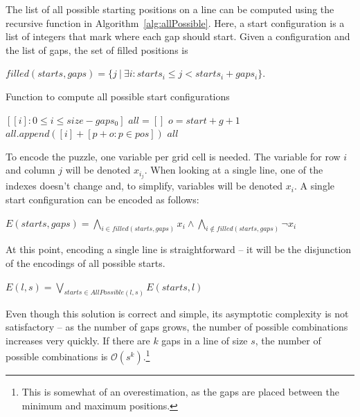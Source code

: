 \documentclass[12pt]{article}
\begin{document}
The list of all possible starting positions on a line can be computed using the recursive function in Algorithm~\ref{alg:allPossible}.
Here, a start configuration is a list of integers that mark where each gap should start.
Given a configuration and the list of gaps, the set of filled positions is

\begin{center}
  $filled(starts, gaps) = \{j\ |\ \exists i: starts_i \le j < starts_i + gaps_i\}$.
\end{center}

\begin{algorithm}
\caption{Function to compute all possible start configurations}\label{alg:allPossible}
\begin{algorithmic}
    \State\Return$[ [i]: 0 \le i \le size - gaps_0]$
  \Else
    \State$all = []$
      \State$o = start + g + 1$ 
          \State $all.append([i] + [p + o: p \in pos])$
      \EndFor
    \EndFor
    \State \Return $all$
  \EndIf
\EndFunction
\end{algorithmic}
\end{algorithm}

To encode the puzzle, one variable per grid cell is needed.
The variable for row $i$ and column $j$ will be denoted $x_i_j$.
When looking at a single line, one of the indexes doesn't change and, to simplify, variables will be denoted $x_i$.
A single start configuration can be encoded as follows:

\begin{center}
  $E(starts, gaps) = \bigwedge\limits_{i \in filled(starts, gaps)}x_i \wedge \bigwedge\limits_{i \notin filled(starts, gaps)} \neg x_i$
\end{center}

At this point, encoding a single line is straightforward -- it will be the disjunction of the encodings of all possible starts.

\begin{center}
  $E(l, s) = \bigvee_{starts \in AllPossible(l, s)} E(starts, l)$
\end{center}

Even though this solution is correct and simple, its asymptotic complexity is not satisfactory -- as the number of gaps grows, the number of possible combinations increases very quickly.
If there are $k$ gaps in a line of size $s$, the number of possible combinations is $\mathcal{O}(s^k)$.\footnote{This is somewhat of an overestimation, as the gaps are placed between the minimum and maximum positions.}
\end{document}
